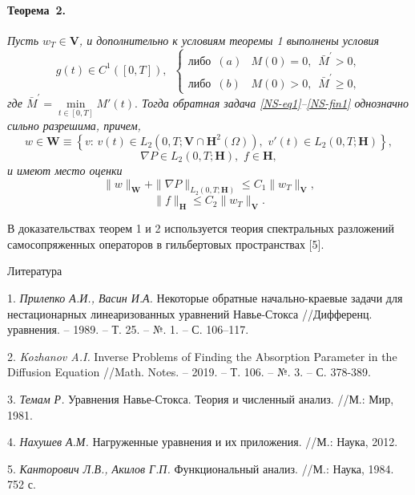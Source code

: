 \paragraph{Теорема~2.} {\it
Пусть $w_T\in\mathbf{V}$, и дополнительно к условиям теоремы 1 выполнены условия
\begin{equation}\label{NS-cond1}
g(t)\in C^1([0,T]),\,\,\,\left\{\begin{array}{ll}
                         \textrm{либо}\,\,\, (a)&M(0)=0,\,\,\, \bar{M}^{\prime}>0,\\
                         \textrm{либо}\,\,\, (b)&M(0)>0,\,\,\, \bar{M}^{\prime}\geq0,
                         \end{array}\right.
\end{equation}
где $\bar{M}^{\prime}=\min\limits_{t\in[0,T]}M'(t).$
Тогда обратная задача \eqref{NS-eq1}--\eqref{NS-fin1} однозначно сильно разрешима, причем,
$$
w\in \mathbf{W}\equiv \left\{v:\, v(t)\in L_2(0,T;\mathbf{V}\cap\mathbf{H}^2(\Omega)),\,\, v'(t)\in L_2(0,T;\mathbf{H})\right\},
$$
$$
\nabla P\in L_2(0,T; \mathbf{H}),\,\, f\in \mathbf{H},
$$
и имеют место оценки
\begin{equation} \label{NS-est3}
\|w\|_{\mathbf{W}}+\|\nabla P\|_{L_2(0,T; \mathbf{H})}\leq C_1\|w_T\|_{\mathbf{V}},
\end{equation}
\begin{equation} \label{NS-est4}
\|f\|_{\mathbf{H}}\leq C_2\|w_T\|_{\mathbf{V}}.
\end{equation}
}

В доказательствах теорем 1 и 2 используется теория спектральных разложений самосопряженных операторов в гильбертовых пространствах [5].


\begin{center}
Литература
\end{center}

1. {\it Прилепко А.И., Васин И.А.} Некоторые обратные на\-чально-краевые задачи для нестационарных линеаризованных уравнений Навье-Стокса //Дифференц. уравнения. – 1989. – Т. 25. – №. 1. – С. 106–117.

2. {\it Kozhanov A.I.} Inverse Problems of Finding the Absorption Parameter in the Diffusion Equation //Math. Notes. – 2019. – Т. 106. – №. 3. – С. 378-389.

3. {\it Темам Р.} Уравнения Навье-Стокса. Теория и численный анализ. //М.: Мир, 1981.

4. {\it Нахушев А.М.}  Нагруженные уравнения и их приложения. //М.: Наука, 2012.

5. {\it Канторович Л.В., Акилов Г.П.} Функциональный анализ. //М.: Наука, 1984. 752 с.

